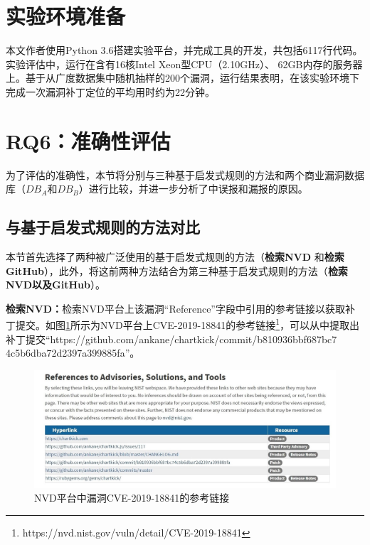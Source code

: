 \section{实验环境准备}
 本文作者使用Python 3.6搭建实验平台，并完成工具\tool 的开发，\tool 共包括6117行代码。实验评估中，\tool 运行在含有16核Intel Xeon型CPU（2.10GHz）、 62GB内存的服务器上。基于从广度数据集中随机抽样的200个漏洞，运行结果表明，\tool 在该实验环境下完成一次漏洞补丁定位的平均用时约为22分钟。


\section{RQ6：准确性评估}\label{sec:accuracy-evaluation}

为了评估\tool 的准确性，本节将\tool 分别与三种基于启发式规则的方法和两个商业漏洞数据库（$DB_A$和$DB_B$）进行比较，并进一步分析了\tool 中误报和漏报的原因。

\subsection{与基于启发式规则的方法对比}
本节首先选择了两种被广泛使用的基于启发式规则的方法（\textbf{检索NVD}\cite{duan2019automating,li2016vulpecker,li2018vuldeepecker} 和\textbf{检索GitHub}\cite{you2017semfuzz,Wang2020empirical}），此外，将这前两种方法结合为第三种基于启发式规则的方法（\textbf{检索NVD以及GitHub}）。

\textbf{检索NVD：}检索NVD平台上该漏洞“Reference”字段中引用的参考链接以获取补丁提交。如图\ref{fig:CVE-2019-18841}所示为NVD平台上CVE-2019-18841的参考链接\footnote{https://nvd.nist.gov/vuln/detail/CVE-2019-18841}，可以从中提取出补丁提交“https://github.com/ankane/chartkick/commit/b810936bbf687bc7\\4c5b6dba72d2397a399885fa”。
\begin{figure}[!t]
    \centering
    \includegraphics[scale=0.44]{fig/NVD-2019-18841}
    \caption{NVD平台中漏洞CVE-2019-18841的参考链接}\label{fig:CVE-2019-18841}
\end{figure}

